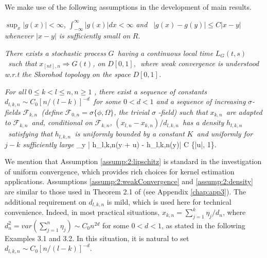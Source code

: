 We make use of the following assumptions in the development of main results.

\begin{assump} 
	$\sup_x|g(x)|<\infty$, $\int_{-\infty}^{\infty}|g(x)|dx<\infty$ \textit{and }\textit{\
	$|g(x)-g(y)|\le C|x-y|$ whenever  $|x-y|$ is sufficiently small on }$R$.
\end{assump}

\begin{assump} 
\textit{There exists a stochastic process }%
$G$\textit{\ having a continuous local time
}$L_{G}(t,s)$\textit{\ such that }$x_{[nt],n}\Rightarrow
G(t)$\textit{, on }$D[0,1],$\textit{\ where
weak convergence is understood w.r.t the Skorohod topology on the space }$%
D[0,1]$\textit{.}
\end{assump}

\begin{assump} 
 \textit{For all }$0\leq k<l\leq n,n\geq 1$ \textit{, there exist a sequence of constants }$d_{l,k,n}\sim C_0 [n/(l-k)]^{-d}$\textit{\ for some $0< d<1$
and a
sequence of increasing }$\sigma $\textit{-fields }${\mathcal F}_{k,n}$\textit{\ (define }$%
{\mathcal F}_{0,n}=\sigma \{\phi ,\Omega \}$\textit{, the trivial }$\sigma $\textit{%
-field) such that} $x_{k,n}$\textit{\ are adapted to }${\mathcal F}_{k,n}$\textit{\
and, conditional on }${\mathcal F}_{k,n}$\textit{,
}$(x_{l,n}-x_{k,n})/d_{l,k,n}$\textit{\ has a density
}$h_{l,k,n}$\textit{\ satisfying that }$h_{l,k,n}$\textit{\ is
uniformly bounded by a constant }$K$\textit{\ and uniformly for $j-k$ sufficiently large}
\be
 \sup_y | h_{l,k,n}(y + u) - h_{l,k,n}(y)| \le C \min\{|u|, 1\}. \la {eqn:2:77}
\ee
\end{assump}

We mention that Assumption \ref{assump:2:lipschitz} is standard in the investigation of uniform convergence,
which provides rich choices for kernel estimation applications. Assumptions \ref{assump:2:weakConvergence} and \ref{assump:2:density} are similar to those used in Theorem 2.1 of \cite{wangphillips2010a} (see Appendix \ref{chap:app3}). The additional requirement on $d_{l,k,n}$ is mild, which is used here for technical convenience.
Indeed, in  most practical situations, $x_{k,n}=\sum_{j=1}^k \eta_j/d_n$, where $d_n^2= var (\sum_{j=1}^n\eta_j)\sim C_0n^{2d}$ for some $0< d<1$, as stated in the following Examples 3.1 and 3.2. In this situation, it is natural to set $d_{l,k,n}\sim C_0 [n/(l-k)]^{-d}$.


